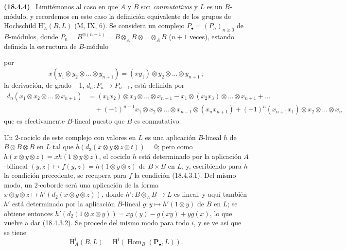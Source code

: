 \documentclass[10pt,oneside]{book}
\makeatletter
\newcommand{\setmanualcurrentlabel}[1]{\def\@currentlabel{#1}}
\newcommand{\oldpage}[2][]{%
  \setcounter{footnote}{0}%
  \marginpar{\scriptsize\textbf{#1}~|~#2}\ignorespaces}
\newenvironment{env}[1][]{\setmanualcurrentlabel{#1}\par\medskip\noindent\textbf{(#1)}\ }{\par}
\providecommand{\setmin}{-}%
\makeatother
\begin{document}
\begin{env}[18.4.4]
\label{0.18.4.4-es}
Limitémonos al caso en que $A$ y $B$ son \emph{conmutativos} y $L$ es un
$B$-módulo, y recordemos en este caso la definición equivalente de los grupos
de Hochschild $\mathrm H_A^i(B,L)$ (M, IX, 6). Se considera un complejo
$P_\bullet=(P_n)_{n\geqslant0}$ de $B$-módulos, donde
$P_n=B^{\otimes(n+1)}=B\otimes_A B\otimes\ldots\otimes_A B$
($n+1$ veces), estando definida la estructura de $B$-módulo

\oldpage[0\textsubscript{IV-1}]{66}

por
\[
  x(y_1\otimes y_2\otimes\ldots\otimes y_{n+1})
  =(xy_1)\otimes y_2\otimes\ldots\otimes y_{n+1}\,;
\]
la derivación, de grado $-1$, $d_n:P_n\to P_{n-1}$, está
definida por
\begin{align*}
  d_n(x_1\otimes x_2\otimes\ldots\otimes x_{n+1})
    &=(x_1x_2)\otimes x_3\otimes\ldots\otimes x_{n+1}
      \setmin x_1\otimes(x_2x_3)\otimes\ldots\otimes x_{n+1}+\ldots\\
    &\quad+(\setmin 1)^{n-1}x_1\otimes x_2\otimes\ldots\otimes x_{n-1}
      \otimes(x_nx_{n+1})
      +(\setmin 1)^n(x_{n+1}x_1)\otimes x_2\otimes\ldots\otimes x_n
\end{align*}
que es efectivamente $B$-lineal puesto que $B$ es conmutativo.

Un $2$-cociclo de este complejo con valores en $L$ es una aplicación
$B$-lineal $h$ de $B\otimes B\otimes B$ en $L$ tal que
$h(d_3(x\otimes y\otimes z\otimes t))=0$; pero como
$h(x\otimes y\otimes z)=xh(1\otimes y\otimes z)$, el cociclo $h$ está
determinado por la aplicación $A$-bilineal
$(y,z)\longmapsto f(y,z)=h(1\otimes y\otimes z)$ de $B\times B$ en $L$, y,
escribiendo para $h$ la condición precedente, se recupera para $f$ la
condición (18.4.3.1). Del mismo modo, un $2$-coborde será una aplicación de la
forma $x\otimes y\otimes z\longmapsto h'(d_2(x\otimes y\otimes z))$, donde
$h':B\otimes_A B\to L$ es lineal, y aquí también $h'$ está determinado por la
aplicación $B$-lineal $g:y\longmapsto h'(1\otimes y)$ de $B$ en $L$; se
obtiene entonces
$h'(d_2(1\otimes x\otimes y))=xg(y)-g(xy)+yg(x)$, lo que vuelve a dar
(18.4.3.2). Se procede del mismo modo para todo $i$, y se ve así que se tiene
\begin{equation}
\label{0.18.4.4.1-es}
\tag{18.4.4.1}
  \mathrm H_A^i(B,L)=\mathrm H^i(\operatorname{Hom}_B(\mathbf P_\bullet,L)).
\end{equation}
\end{env}
\end{document}
